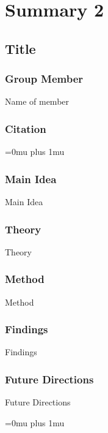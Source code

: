 \section{Summary 2}

\noindent
\subsection{Title}

\subsubsection{Group Member}

\noindent
Name of member

\noindent
\subsubsection{Citation}

\Urlmuskip=0mu plus 1mu\relax
{}

\subsubsection{Main Idea}

\noindent
Main Idea

\subsubsection{Theory}

\noindent
Theory

\subsubsection{Method}

\noindent
Method

\subsubsection{Findings}

\noindent
Findings

\subsubsection{Future Directions}

\noindent
Future Directions 

\Urlmuskip=0mu plus 1mu\relax

\pagebreak